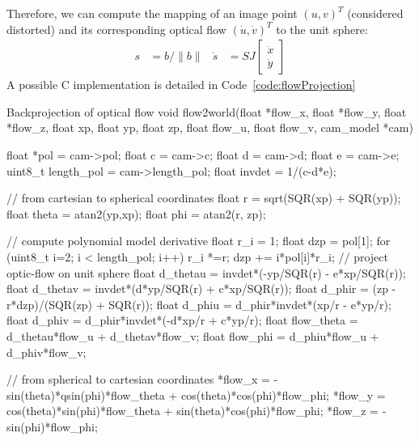 Therefore, we can compute the mapping of an image point $(u,v)^T$ (considered distorted) and its corresponding optical flow $(\dot{u}, \dot{v})^T$ to the unit sphere:
\begin{align}
s &= b/\|b\| & \dot{s} &= SJ \begin{bmatrix} \dot{x} \\ \dot{y} \end{bmatrix}
\end{align}
A possible C implementation is detailed in Code~\ref{code:flowProjection}

\begin{code}[colback=white, label=code:flowProjection]{Backprojection of optical flow}
void flow2world(float *flow_x, float *flow_y, float *flow_z, 
		float xp, float yp, float zp, float flow_u, 
		float flow_v, cam_model *cam)
{
	 float *pol    = cam->pol;
	 float c       = cam->c;
	 float d       = cam->d;
	 float e       = cam->e;
	 uint8_t length_pol = cam->length_pol;
	 float invdet  = 1/(c-d*e); 
	 
	 // from cartesian to spherical coordinates
	 float r   = sqrt(SQR(xp) + SQR(yp));
	 float theta = atan2(yp,xp);
	 float phi = atan2(r, zp); 
	 
	 // compute polynomial model derivative
	 float r_i = 1;
	 float dzp = pol[1];
	 for (uint8_t i=2; i < length_pol; i++)
	 {
	   r_i *=r;
	   dzp += i*pol[i]*r_i;
	 }
	 // project optic-flow on unit sphere
	 float d_thetau = invdet*(-yp/SQR(r) - e*xp/SQR(r));
	 float d_thetav = invdet*(d*yp/SQR(r) + c*xp/SQR(r));
	 float d_phir = (zp - r*dzp)/(SQR(zp) + SQR(r));
	 float d_phiu = d_phir*invdet*(xp/r - e*yp/r);
	 float d_phiv = d_phir*invdet*(-d*xp/r + c*yp/r);
	 float flow_theta = d_thetau*flow_u 
	 		   + d_thetav*flow_v;
	 float flow_phi = d_phiu*flow_u + d_phiv*flow_v;
	 
	 // from spherical to cartesian coordinates
	 *flow_x = -sin(theta)*qsin(phi)*flow_theta 
	 	   + cos(theta)*cos(phi)*flow_phi;
	 *flow_y = cos(theta)*sin(phi)*flow_theta 
	 	   + sin(theta)*cos(phi)*flow_phi;
	 *flow_z = -sin(phi)*flow_phi;
}
\end{code}

